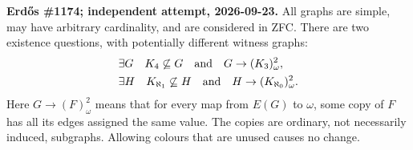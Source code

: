 \textbf{Erd\H{o}s \#1174; independent attempt, 2026-09-23.}
All graphs are simple, may have arbitrary cardinality, and are considered in ZFC. There are two existence questions, with potentially different witness graphs:
\[
\begin{split}
&\exists G\quad K_4\not\subseteq G
\quad\hbox{and}\quad G\to(K_3)^2_\omega,\\
&\exists H\quad K_{\aleph_1}\not\subseteq H
\quad\hbox{and}\quad H\to(K_{\aleph_0})^2_\omega.
\end{split}
\]
Here $G\to(F)^2_\omega$ means that for every map from $E(G)$ to $\omega$, some copy of $F$ has all its edges assigned the same value. The copies are ordinary, not necessarily induced, subgraphs. Allowing colours that are unused causes no change.
